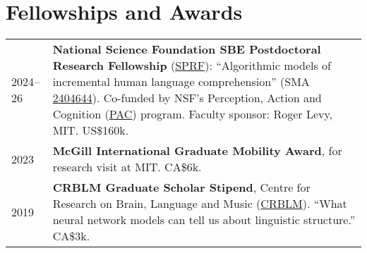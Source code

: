 \documentclass[11pt,a4paper]{article}
\begin{document}

  \section{Fellowships and Awards}
  \begin{longtable}{p{1.7cm}|p{15cm}}
    \textsc{2024--26}&%
      \textbf{National Science Foundation SBE Postdoctoral Research Fellowship} (\href{https://new.nsf.gov/funding/opportunities/sbe-postdoctoral-research-fellowships-sprf}{SPRF}): ``Algorithmic models of incremental human language comprehension''
      (SMA \href{https://www.nsf.gov/awardsearch/showAward?AWD_ID=2404644&}{2404644}). 
      Co-funded by NSF's Perception, Action and Cognition (\href{https://new.nsf.gov/funding/opportunities/perception-action-cognition-pac}{PAC}) program.
      Faculty sponsor: Roger Levy, MIT\@.
      US\$160k.\\
    \textsc{2023}&%
      \textbf{McGill International Graduate Mobility Award},
      for research visit at MIT\@. CA\$6k.\\
    \textsc{2019}&%
      \textbf{CRBLM Graduate Scholar Stipend}, Centre for Research on Brain, Language
      and Music (\href{https://crblm.ca/}{CRBLM}). ``What neural network models
      can tell us about linguistic structure.'' CA\$3k.\\
  \end{longtable}
\end{document}
